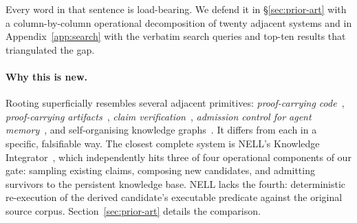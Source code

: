 \documentclass[10pt,a4paper]{article}
\begin{document}
Every word in that sentence is load-bearing. We defend it in
§\ref{sec:prior-art} with a column-by-column operational decomposition of
twenty adjacent systems and in Appendix~\ref{app:search} with the
verbatim search queries and top-ten results that triangulated the gap.

\paragraph{Why this is new.} Rooting superficially resembles several
adjacent primitives: \emph{proof-carrying code}~\cite{necula1996pcc},
\emph{proof-carrying artifacts}~\cite{prism2025}, \emph{claim
verification}~\cite{claimver2024,claimpkg2025,verifyingraph2025},
\emph{admission control for agent memory}~\cite{admissioncontrol2026}, and
self-organising knowledge graphs~\cite{buehler2025agentic,sciagents2024}. It
differs from each in a specific, falsifiable way. The closest complete
system is NELL's Knowledge Integrator~\cite{nell2015,nell2018cacm}, which
independently hits three of four operational components of our gate:
sampling existing claims, composing new candidates, and admitting survivors
to the persistent knowledge base. NELL lacks the fourth: deterministic
re-execution of the derived candidate's executable predicate against the
original source corpus. Section~\ref{sec:prior-art} details the comparison.
\end{document}
